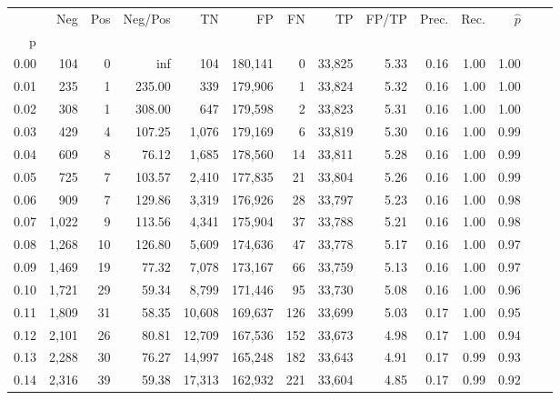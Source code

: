 \begin{tabular}{rrrrrrrrrrrrrr}
\toprule
{} &    Neg &  Pos & Neg/Pos &       TN &       FP &      FN &      TP & FP/TP & Prec. &  Rec. & $\hat{p}$ \\
p    &        &      &         &          &          &         &         &       &       &       &           \\
\midrule
0.00 &    104 &    0 &     inf &      104 &  180,141 &       0 &  33,825 &  5.33 &  0.16 &  1.00 &      1.00 \\
0.01 &    235 &    1 &  235.00 &      339 &  179,906 &       1 &  33,824 &  5.32 &  0.16 &  1.00 &      1.00 \\
0.02 &    308 &    1 &  308.00 &      647 &  179,598 &       2 &  33,823 &  5.31 &  0.16 &  1.00 &      1.00 \\
0.03 &    429 &    4 &  107.25 &    1,076 &  179,169 &       6 &  33,819 &  5.30 &  0.16 &  1.00 &      0.99 \\
0.04 &    609 &    8 &   76.12 &    1,685 &  178,560 &      14 &  33,811 &  5.28 &  0.16 &  1.00 &      0.99 \\
0.05 &    725 &    7 &  103.57 &    2,410 &  177,835 &      21 &  33,804 &  5.26 &  0.16 &  1.00 &      0.99 \\
0.06 &    909 &    7 &  129.86 &    3,319 &  176,926 &      28 &  33,797 &  5.23 &  0.16 &  1.00 &      0.98 \\
0.07 &  1,022 &    9 &  113.56 &    4,341 &  175,904 &      37 &  33,788 &  5.21 &  0.16 &  1.00 &      0.98 \\
0.08 &  1,268 &   10 &  126.80 &    5,609 &  174,636 &      47 &  33,778 &  5.17 &  0.16 &  1.00 &      0.97 \\
0.09 &  1,469 &   19 &   77.32 &    7,078 &  173,167 &      66 &  33,759 &  5.13 &  0.16 &  1.00 &      0.97 \\
0.10 &  1,721 &   29 &   59.34 &    8,799 &  171,446 &      95 &  33,730 &  5.08 &  0.16 &  1.00 &      0.96 \\
0.11 &  1,809 &   31 &   58.35 &   10,608 &  169,637 &     126 &  33,699 &  5.03 &  0.17 &  1.00 &      0.95 \\
0.12 &  2,101 &   26 &   80.81 &   12,709 &  167,536 &     152 &  33,673 &  4.98 &  0.17 &  1.00 &      0.94 \\
0.13 &  2,288 &   30 &   76.27 &   14,997 &  165,248 &     182 &  33,643 &  4.91 &  0.17 &  0.99 &      0.93 \\
0.14 &  2,316 &   39 &   59.38 &   17,313 &  162,932 &     221 &  33,604 &  4.85 &  0.17 &  0.99 &      0.92 \\

\end{tabular}
